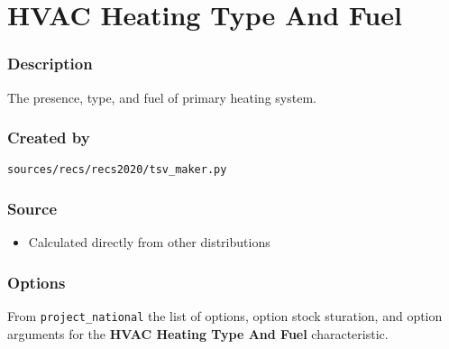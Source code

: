 \section{HVAC Heating Type And
Fuel}\label{hvac_heating_type_and_fuel}

\subsubsection{Description}\label{description-73}

The presence, type, and fuel of primary heating system.

\subsubsection{Created by}\label{created-by-73}

\texttt{sources/recs/recs2020/tsv\_maker.py}

\subsubsection{Source}\label{source-72}

\begin{itemize}
 
\item
  Calculated directly from other distributions
\end{itemize}

\subsubsection{Options}\label{options-73}

From \texttt{project\_national} the list of options, option stock
sturation, and option arguments for the \textbf{HVAC Heating Type And
Fuel} characteristic.

